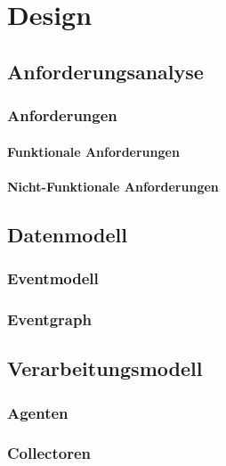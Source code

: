 %

\chapter{Design}
\label{chapter:Design}
\section{Anforderungsanalyse}
\label{section:Anforderungsanalyse}
\subsection{Anforderungen}
\label{subsection:Anforderungen}
\subsubsection{Funktionale Anforderungen}
\label{subsection:Funktionale Anforderungen}
\subsubsection{Nicht-Funktionale Anforderungen}
\label{subsection:Nicht-Funktionale Anforderungen}
\section{Datenmodell}
\label{section:Datenmodell}
\subsection{Eventmodell}
\label{subsection:Eventmodell}
\subsection{Eventgraph}
\label{subsection:Eventgraph}
\section{Verarbeitungsmodell}
\label{section:Verarbeitungsmodell}
\subsection{Agenten}
\label{subsection:Agenten}
\subsection{Collectoren}
\label{subsection:Collectoren}


